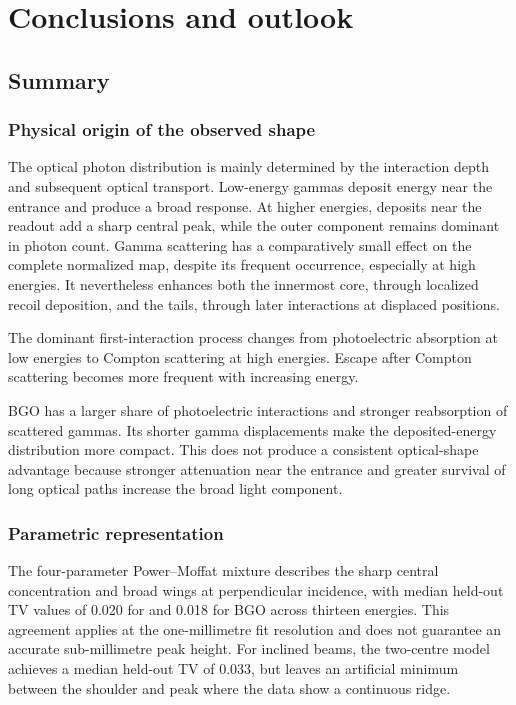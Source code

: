 \chapter{Conclusions and outlook}
\section{Summary}

\subsection{Physical origin of the observed shape}

The optical photon distribution is mainly determined by the interaction depth and subsequent optical transport. Low-energy gammas deposit energy near the entrance and produce a broad response. At higher energies, deposits near the readout add a sharp central peak, while the outer component remains dominant in photon count. Gamma scattering has a comparatively small effect on the complete normalized map, despite its frequent occurrence, especially at high energies. It nevertheless enhances both the innermost core, through localized recoil deposition, and the tails, through later interactions at displaced positions.

The dominant first-interaction process changes from photoelectric absorption at low energies to Compton scattering at high energies. Escape after Compton scattering becomes more frequent with increasing energy.

BGO has a larger share of photoelectric interactions and stronger reabsorption of scattered gammas. Its shorter gamma displacements make the deposited-energy distribution more compact. This does not produce a consistent optical-shape advantage because stronger attenuation near the entrance and greater survival of long optical paths increase the broad light component.

\subsection{Parametric representation}

The four-parameter Power--Moffat mixture describes the sharp central concentration and broad wings at perpendicular incidence, with median held-out TV values of 0.020 for  and 0.018 for BGO across thirteen energies. This agreement applies at the one-millimetre fit resolution and does not guarantee an accurate sub-millimetre peak height. For inclined beams, the two-centre model achieves a median held-out TV of 0.033, but leaves an artificial minimum between the shoulder and peak where the data show a continuous ridge.

